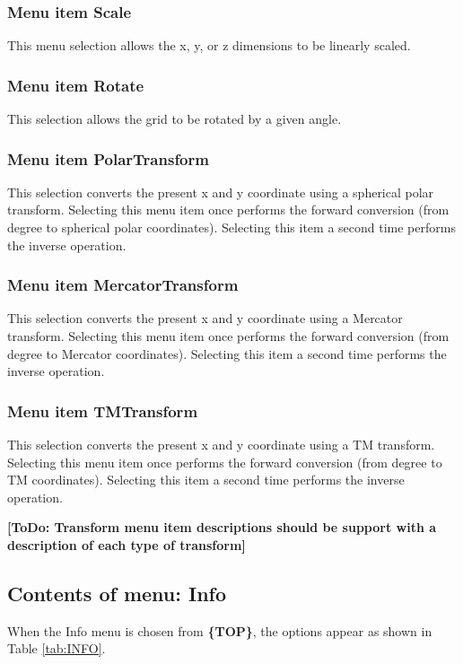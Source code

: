 \documentclass{article}
\begin{document}
\subsubsection{Menu item Scale}
This menu selection allows the x, y, or z dimensions to be linearly scaled.

\subsubsection{Menu item Rotate}
This selection allows the grid to be rotated by a given angle.

\subsubsection{Menu item PolarTransform}
This selection converts the present x and y coordinate using a spherical polar transform.  Selecting this menu item once performs the forward conversion (from degree to spherical polar coordinates).  Selecting this item a second time performs the inverse operation.


\subsubsection{Menu item MercatorTransform}
This selection converts the present x and y coordinate using a Mercator transform.  Selecting this menu item once performs the forward conversion (from degree to Mercator coordinates).  Selecting this item a second time performs the inverse operation.

\subsubsection{Menu item TMTransform}
This selection converts the present x and y coordinate using a TM transform.  Selecting this menu item once performs the forward conversion (from degree to TM coordinates).  Selecting this item a second time performs the inverse operation.

\textbf{[ToDo: Transform menu item descriptions should be support with a description of each type of transform]}


\subsection{Contents of menu: Info}
When the Info menu is chosen from \textbf{\{TOP\}}, the options appear as shown in Table \ref{tab:INFO}.
\end{document}
